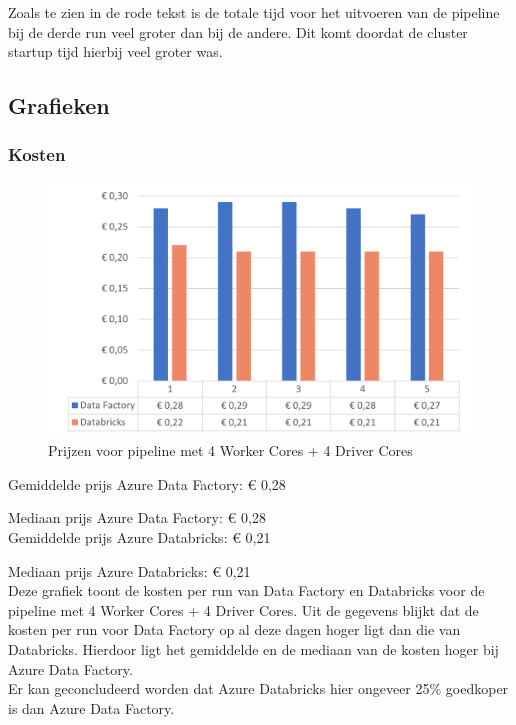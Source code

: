 Zoals te zien in de rode tekst is de totale tijd voor het uitvoeren van de pipeline bij de derde run veel groter dan bij de andere. Dit komt doordat de cluster startup tijd hierbij veel groter was.

\subsection{Grafieken}

\subsubsection{Kosten}

\begin{figure}[H]
    \centering
    \includegraphics[width=1\textwidth]{./graphics/kosten/graf1_update.png}
    \caption{Prijzen voor pipeline met 4 Worker Cores + 4 Driver Cores}
\end{figure}

Gemiddelde prijs Azure Data Factory: € 0,28

Mediaan prijs Azure Data Factory: € 0,28\\

Gemiddelde prijs Azure Databricks: € 0,21

Mediaan prijs Azure Databricks: € 0,21\\
    
Deze grafiek toont de kosten per run van Data Factory en Databricks voor de pipeline met 4 Worker Cores + 4 Driver Cores. Uit de gegevens blijkt dat de kosten per run voor Data Factory op al deze dagen hoger ligt dan die van Databricks. Hierdoor ligt het gemiddelde en de mediaan van de kosten hoger bij Azure Data Factory.\\

Er kan geconcludeerd worden dat Azure Databricks hier ongeveer 25\% goedkoper is dan Azure Data Factory.

